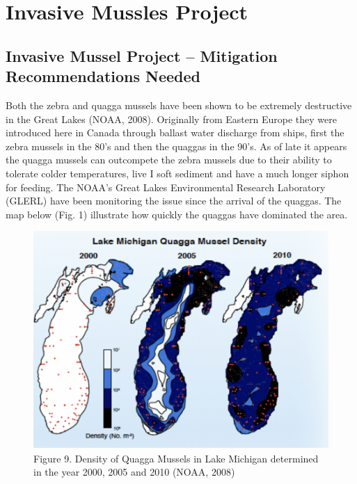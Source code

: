 \documentclass[
]{book}
\begin{document}
\hypertarget{invasive-mussles-project}{%
\section*{Invasive Mussles Project}\label{invasive-mussles-project}}

\hypertarget{invasive-mussel-project-mitigation-recommendations-needed}{%
\subsection*{Invasive Mussel Project -- Mitigation Recommendations Needed}\label{invasive-mussel-project-mitigation-recommendations-needed}}

Both the zebra and quagga mussels have been shown to be extremely destructive in the Great Lakes (NOAA, 2008). Originally from Eastern Europe they were introduced here in Canada through ballast water discharge from ships, first the zebra mussels in the 80's and then the quaggas in the 90's. As of late it appears the quagga mussels can outcompete the zebra mussels due to their ability to tolerate colder temperatures, live I soft sediment and have a much longer siphon for feeding. The NOAA's Great Lakes Environmental Research Laboratory (GLERL) have been monitoring the issue since the arrival of the quaggas. The map below (Fig. 1) illustrate how quickly the quaggas have dominated the area.

\begin{figure}
\centering
\includegraphics{images/figure9.png}
\caption{Figure 9. Density of Quagga Mussels in Lake Michigan determined in the year 2000, 2005 and 2010 (NOAA, 2008)}
\end{figure}
\end{document}
